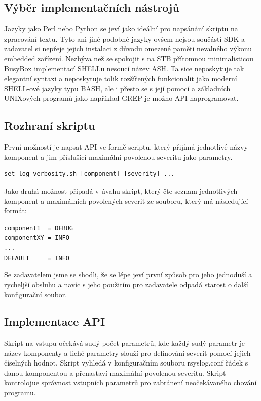 \documentclass[thesis=B,czech]{FITthesis}[2012/06/26]
\begin{document}
\subsection{Výběr implementačních nástrojů}
Jazyky jako Perl nebo Python se jeví jako ideální pro napsánání skriptu na zpracování textu. Tyto ani jiné podobné jazyky ovšem nejsou součástí SDK a zadavatel si nepřeje jejich instalaci z důvodu omezené paměti nevalného výkonu embedded zařízení. Nezbýva než se spokojit s na STB přítomnou minimalisticou BusyBox implementací SHELLu nesoucí název ASH. Ta sice neposkytuje tak elegantní syntaxi a neposkytuje tolik rozšířených funkcionalit jako moderní SHELL-ové jazyky typu BASH, ale i přesto se s její pomocí a základních UNIXových programů jako například GREP je možno API naprogramovat.

\subsection{Rozhraní skriptu}
První možností je napsat API ve formě scriptu, který přijímá jednotlivé názvy komponent a jim příslušící maximální povolenou severitu jako parametry.

\begin{lstlisting}[style=RainerScriptSimpleStyle]
set_log_verbosity.sh [component] [severity] ...
\end{lstlisting}

Jako druhá možnost připadá v úvahu skript, který čte seznam jednotlivých komponent a maximálních povolených severit ze souboru, který má následující formát:

\begin{lstlisting}[style=RainerScriptSimpleStyle]
component1  = DEBUG
componentXY = INFO
...
DEFAULT     = INFO
\end{lstlisting}

Se zadavatelem jsme se shodli, že se lépe jeví první způsob pro jeho jednoduší a rycheljší obsluhu a navíc s jeho použitím pro zadavatele odpadá starost o další konfigurační soubor.

\subsection{Implementace API}
Skript na vstupu očekává sudý počet parametrů, kde každý sudý parametr je název komponenty a liché parametry slouží pro definování severit pomocí jejich číselných hodnot.
Skript vyhledá v konfiguračním souboru rsyslog.conf řádek s danou komponentou a přenastaví maximální povolenou severitu. Skript kontrolojue správnost vstupních parametrů pro zabránení neočekávaného chování programu.
\end{document}
